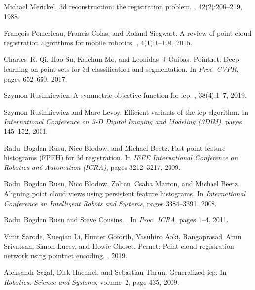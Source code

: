 \documentclass[10pt,twocolumn,letterpaper]{article}
\begin{document}
\begin{thebibliography}{10}
Michael Merickel.
\newblock 3d reconstruction: the registration problem.
,
  42(2):206--219, 1988.

Fran{\c{c}}ois Pomerleau, Francis Colas, and Roland Siegwart.
\newblock A review of point cloud registration algorithms for mobile robotics.
, 4(1):1--104, 2015.

Charles~R. Qi, Hao Su, Kaichun Mo, and Leonidas~J Guibas.
\newblock Pointnet: Deep learning on point sets for 3d classification and
  segmentation.
\newblock In {\em {Proc. CVPR}}, pages 652--660, 2017.

Szymon Rusinkiewicz.
\newblock A symmetric objective function for icp.
, 38(4):1--7, 2019.

Szymon Rusinkiewicz and Marc Levoy.
\newblock Efficient variants of the icp algorithm.
\newblock In {\em International Conference on 3-D Digital Imaging and Modeling
  (3DIM)}, pages 145--152, 2001.

Radu~Bogdan Rusu, Nico Blodow, and Michael Beetz.
\newblock Fast point feature histograms ({FPFH}) for 3d registration.
\newblock In {\em IEEE International Conference on Robotics and Automation
  (ICRA)}, pages 3212--3217, 2009.

Radu~Bogdan Rusu, Nico Blodow, Zoltan~Csaba Marton, and Michael Beetz.
\newblock Aligning point cloud views using persistent feature histograms.
\newblock In {\em International Conference on Intelligent Robots and Systems},
  pages 3384--3391, 2008.

Radu~Bogdan Rusu and Steve Cousins.
.
\newblock In {\em {Proc. ICRA}}, pages 1--4, 2011.

Vinit Sarode, Xueqian Li, Hunter Goforth, Yasuhiro Aoki, Rangaprasad~Arun
  Srivatsan, Simon Lucey, and Howie Choset.
\newblock Pcrnet: Point cloud registration network using pointnet encoding.
, 2019.

Aleksandr Segal, Dirk Haehnel, and Sebastian Thrun.
\newblock Generalized-icp.
\newblock In {\em Robotics: Science and Systems}, volume~2, page 435, 2009.


\end{thebibliography}
\end{document}
